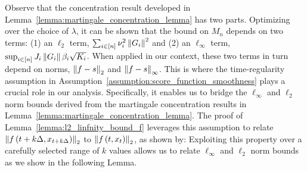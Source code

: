Observe that the concentration result developed in Lemma~\ref{lemma:martingale_concentration_lemma} has two parts. Optimizing over the choice of $\lambda$, it can be shown that the bound on $M_{n}$ depends on two terms: (1) an $\ell_{2}$ term,  $\sum_{i\in[n]}\nu_{i}^{2}\left\lVert G_i\right\rVert^{2}$ and (2) an $\ell_{\infty}$ term, $\sup_{i \in [n]}J_{i}\left\lVert G_{i}\right\rVert\beta_{i}\sqrt{K_i}$. When applied in our context, these two terms in turn depend on norms, $\left\lVert f-s\right\rVert_{2}$ and $\left\lVert f-s\right\rVert_{\infty}$. This is where the time-regularity assumption in Assumption~\ref{assumption:score_function_smoothness} plays a crucial role in our analysis. Specifically, it enables us to bridge the $\ell_{\infty}$ and $\ell_{2}$ norm bounds derived from the martingale concentration results in Lemma~\ref{lemma:martingale_concentration_lemma}. The proof of Lemma~\ref{lemma:l2_linfnity_bound_f} leverages this assumption to relate $\left\lVert f\left(t+k\Delta, x_{t+k\Delta}\right)\right\rVert_{2}$ to $\left\lVert f\left(t, x_{t}\right)\right\rVert_{2}$, as shown by:
 Exploiting this  property over a carefully selected range of $k$ values allows us to relate $\ell_{\infty}$ and $\ell_{2}$ norm bounds as we show in the following Lemma. 

